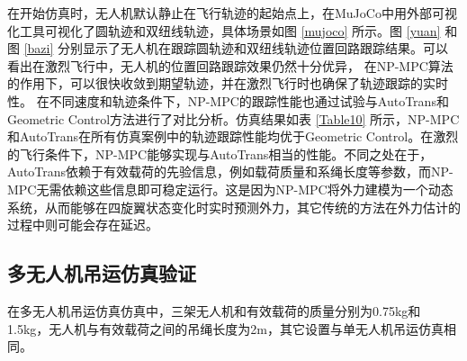 \documentclass[lang=chs, degree=master, blindreview=false, winfonts=true]{yanputhesis}
\begin{document}
在开始仿真时，无人机默认静止在飞行轨迹的起始点上，在MuJoCo中用外部可视化工具可视化了圆轨迹和双纽线轨迹，具体场景如图 \ref{mujoco} 所示。图 \ref{yuan} 和图 \ref{bazi} 分别显示了无人机在跟踪圆轨迹和双纽线轨迹位置回路跟踪结果。可以看出在激烈飞行中，无人机的位置回路跟踪效果仍然十分优异， 在NP-MPC算法的作用下，可以很快收敛到期望轨迹，并在激烈飞行时也确保了轨迹跟踪的实时性。
在不同速度和轨迹条件下，NP-MPC的跟踪性能也通过试验与AutoTrans和Geometric Control方法进行了对比分析。仿真结果如表 \ref{Table10} 所示，NP-MPC和AutoTrans在所有仿真案例中的轨迹跟踪性能均优于Geometric Control。在激烈的飞行条件下，NP-MPC能够实现与AutoTrans相当的性能。不同之处在于，AutoTrans依赖于有效载荷的先验信息，例如载荷质量和系绳长度等参数，而NP-MPC无需依赖这些信息即可稳定运行。这是因为NP-MPC将外力建模为一个动态系统，从而能够在四旋翼状态变化时实时预测外力，其它传统的方法在外力估计的过程中则可能会存在延迟。

\subsection{多无人机吊运仿真验证}
在多无人机吊运仿真仿真中，三架无人机和有效载荷的质量分别为0.75kg和1.5kg，无人机与有效载荷之间的吊绳长度为2m，其它设置与单无人机吊运仿真相同。
\end{document}

